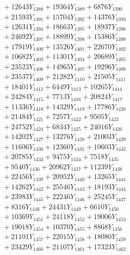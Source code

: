 \documentclass[a4paper,10pt]{article}
\begin{document}
{\begin{align}
&\;  + 12643 Y_{1388} + 19364 Y_{1389} + 6876 Y_{1390} \\[0.3ex]
&\;  + 21593 Y_{1391} + 15704 Y_{1392} + 14376 Y_{1393} \\[0.3ex]
&\;  + 12631 Y_{1394} + 18663 Y_{1395} + 18937 Y_{1396} \\[0.3ex]
&\;  + 24692 Y_{1397} + 18899 Y_{1398} + 15386 Y_{1399} \\[0.3ex]
&\;  + 17919 Y_{1400} + 13526 Y_{1401} + 22670 Y_{1402} \\[0.3ex]
&\;  + 10682 Y_{1403} + 11301 Y_{1404} + 20689 Y_{1405} \\[0.3ex]
&\;  + 23523 Y_{1406} + 14965 Y_{1407} + 19296 Y_{1408} \\[0.5ex]\allowbreak
&\;  + 23537 Y_{1409} + 21282 Y_{1410} + 21505 Y_{1411} \\[0.3ex]
&\;  + 18401 Y_{1412} + 6449 Y_{1413} + 10265 Y_{1414} \\[0.3ex]
&\;  + 24284 Y_{1415} + 7713 Y_{1416} + 20824 Y_{1417} \\[0.3ex]
&\;  + 11336 Y_{1418} + 14329 Y_{1419} + 17786 Y_{1420} \\[0.3ex]
&\;  + 21484 Y_{1421} + 7257 Y_{1422} + 9505 Y_{1423} \\[0.3ex]
&\;  + 24752 Y_{1424} + 6834 Y_{1425} + 24016 Y_{1426} \\[0.3ex]
&\;  + 14202 Y_{1427} + 13276 Y_{1428} + 21003 Y_{1429} \\[0.3ex]
&\;  + 11606 Y_{1430} + 12360 Y_{1431} + 10603 Y_{1432} \\[0.3ex]
&\;  + 20785 Y_{1433} + 9475 Y_{1434} + 7518 Y_{1435} \\[0.3ex]
&\;  + 9540 Y_{1436} + 20962 Y_{1437} + 11239 Y_{1438} \\[0.5ex]\allowbreak
&\;  + 22456 Y_{1439} + 20952 Y_{1440} + 13265 Y_{1441} \\[0.3ex]
&\;  + 14262 Y_{1442} + 25546 Y_{1443} + 18193 Y_{1444} \\[0.3ex]
&\;  + 23983 Y_{1445} + 22246 Y_{1446} + 25245 Y_{1447} \\[0.3ex]
&\;  + 8316 Y_{1448} + 24431 Y_{1449} + 6610 Y_{1450} \\[0.3ex]
&\;  + 10369 Y_{1451} + 24118 Y_{1452} + 19006 Y_{1453} \\[0.3ex]
&\;  + 19018 Y_{1454} + 10370 Y_{1455} + 8868 Y_{1456} \\[0.3ex]
&\;  + 21101 Y_{1457} + 22015 Y_{1458} + 18080 Y_{1459} \\[0.3ex]
&\;  + 23429 Y_{1460} + 21107 Y_{1461} + 17323 Y_{1462} \\[0.3ex]

\end{align}}
\end{document}
